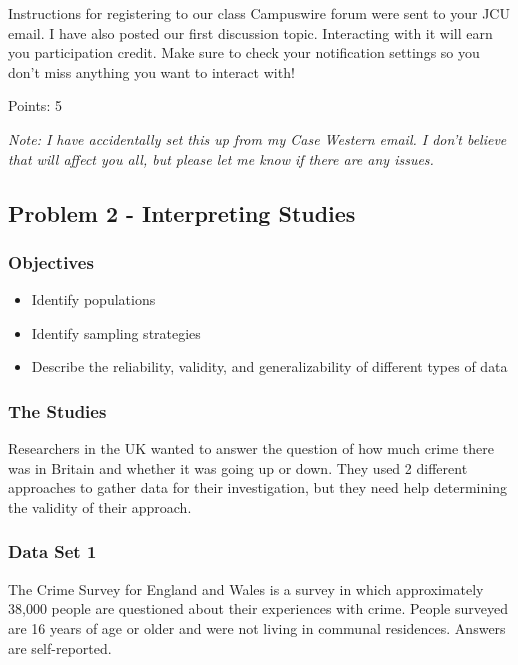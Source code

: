 \documentclass[
  letterpaper,
  DIV=11,
  numbers=noendperiod]{scrartcl}
\begin{document}
Instructions for registering to our class Campuswire forum were sent to
your JCU email. I have also posted our first discussion topic.
Interacting with it will earn you participation credit. Make sure to
check your notification settings so you don't miss anything you want to
interact with!

Points: 5

\emph{Note: I have accidentally set this up from my Case Western email.
I don't believe that will affect you all, but please let me know if
there are any issues.}

\subsection{Problem 2 - Interpreting
Studies}\label{problem-2---interpreting-studies}

\subsubsection{Objectives}\label{objectives-1}

\begin{itemize}
\item
  Identify populations
\item
  Identify sampling strategies
\item
  Describe the reliability, validity, and generalizability of different
  types of data
\end{itemize}

\subsubsection{The Studies}\label{the-studies}

Researchers in the UK wanted to answer the question of how much crime
there was in Britain and whether it was going up or down. They used 2
different approaches to gather data for their investigation, but they
need help determining the validity of their approach.

\subsubsection{Data Set 1}\label{data-set-1}

The Crime Survey for England and Wales is a survey in which
approximately 38,000 people are questioned about their experiences with
crime. People surveyed are 16 years of age or older and were not living
in communal residences. Answers are self-reported.
\end{document}
